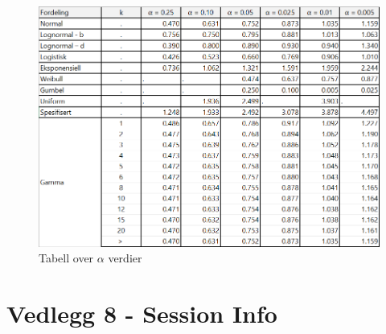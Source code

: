 \documentclass[
]{book}
\begin{document}
\begin{figure}
\centering
\includegraphics{AD-alpha.png}
\caption{Tabell over \(\alpha\) verdier}
\end{figure}

\hypertarget{vedlegg-8---session-info}{%
\chapter*{Vedlegg 8 - Session Info}\label{vedlegg-8---session-info}}
\end{document}
